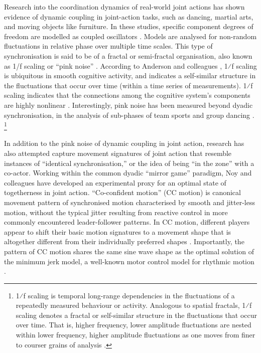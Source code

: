 \begin{CJK}{UTF8}{gbsn}
Research into the coordination dynamics of real-world joint actions  has shown evidence of dynamic coupling in joint-action tasks, such as dancing, martial arts, and moving objects like furniture.  In these studies, specific component degrees of freedom are modelled as coupled oscillators \citep[using the HKB model, which describes the change in the relative phase between two oscillatory components.   See][]{Haken1985,Kelso1986}.  Models are analysed for non-random fluctuations in relative phase over multiple time scales.  This type of synchronisation is said to be of a fractal or semi-fractal organisation, also known as 1/f scaling or ``pink noise'' \citep{Caron2017}.  According to Anderson and colleagues \citep{Anderson2012}, 1⁄f scaling is ubiquitous in smooth cognitive activity, and indicates a self-similar structure in the fluctuations that occur over time (within a time series of measurements).
1⁄f scaling indicates that the connections among the cognitive system's components are highly nonlinear \citep{Ding2002,Holden2013,Kello2010,Riley2011,VanOrden2003,VanOrden2005}. Interestingly, pink noise has been measured beyond dyadic synchronisation, in the analysis of sub-phases of team sports \citep{Passos2014,Duarte2012} and group dancing \citep{Chauvigne2017}.
  \footnote{1⁄f scaling is temporal long-range dependencies in the fluctuations of a repeatedly measured behaviour or activity. Analogous to spatial fractals, 1⁄f scaling denotes a fractal or self-similar structure in the fluctuations that occur over time. That is, higher frequency, lower amplitude fluctuations are nested within lower frequency, higher amplitude fluctuations as one moves from finer to courser grains of analysis \cites(for a more detailed description see, for example)(){Holden2005}{Kello2009}.}

In addition to the pink noise of dynamic coupling in joint action, research has also attempted capture movement signatures of joint action that resemble instances of ``identical synchronisation,'' or the idea of being ``in the zone'' with a co-actor.  Working within the common dyadic ``mirror game'' paradigm, Noy and colleagues \textcite{Noy2011,Noy2015,Hart2014} have developed an experimental proxy for an optimal state of togetherness in joint action.  ``Co-confident motion'' (CC motion) is canonical movement pattern of synchronised motion characterised by smooth and jitter-less motion, without the typical jitter resulting from reactive control in more commonly encountered leader-follower patterns.  In CC motion, different players appear to shift their basic motion signatures to a movement shape that is altogether different from their individually preferred shapes \citep{Hart2014}. Importantly, the pattern of CC motion shares the same sine wave shape as the optimal solution of the minimum jerk model, a well-known motor control model for rhythmic motion \citep{Hogan2007}.


\end{CJK}
